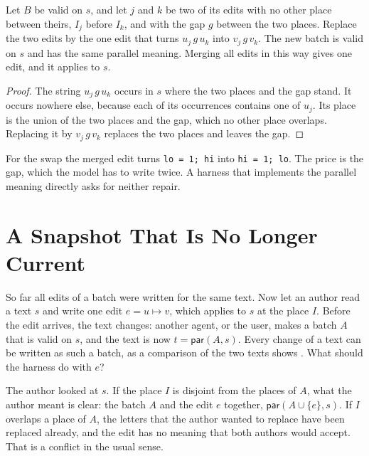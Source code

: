 \documentclass[acmsmall,nonacm,screen]{acmart}
\newcommand{\kw}[1]{\mathsf{#1}}
\newcommand{\str}[1]{\texttt{#1}}
\newcommand{\Par}{\kw{par}}
\begin{document}
\begin{proposition}[Merging]\label{prop:merge}
Let $B$ be valid on $s$, and let $j$ and $k$ be two of its edits with no other place between
theirs, $I_j$ before $I_k$, and with the gap $g$ between the two places. Replace the two
edits by the one edit that turns $u_j\,g\,u_k$ into $v_j\,g\,v_k$. The new batch is valid on
$s$ and has the same parallel meaning. Merging all edits in this way gives one edit, and it
applies to $s$.
\end{proposition}

\begin{proof}
The string $u_j\,g\,u_k$ occurs in $s$ where the two places and the gap stand. It occurs
nowhere else, because each of its occurrences contains one of $u_j$. Its place is the union
of the two places and the gap, which no other place overlaps. Replacing it by $v_j\,g\,v_k$
replaces the two places and leaves the gap.
\end{proof}

For the swap the merged edit turns \str{lo = 1; hi} into \str{hi = 1; lo}. The price is the
gap, which the model has to write twice. A harness that implements the parallel meaning
directly asks for neither repair.

\section{A Snapshot That Is No Longer Current}\label{sec:stale}

So far all edits of a batch were written for the same text. Now let an author read a text
$s$ and write one edit $e = u \mapsto v$, which applies to $s$ at the place $I$. Before the
edit arrives, the text changes: another agent, or the user, makes a batch $A$ that is valid
on $s$, and the text is now $t = \Par(A, s)$. Every change of a text can be written as such a
batch, as a comparison of the two texts shows \citep{Myers1986}. What should the harness do
with $e$?

The author looked at $s$. If the place $I$ is disjoint from the places of $A$, what the
author meant is clear: the batch $A$ and the edit $e$ together, $\Par(A \cup \{e\}, s)$. If
$I$ overlaps a place of $A$, the letters that the author wanted to replace have been
replaced already, and the edit has no meaning that both authors would accept. That is a
conflict in the usual sense.
\end{document}
